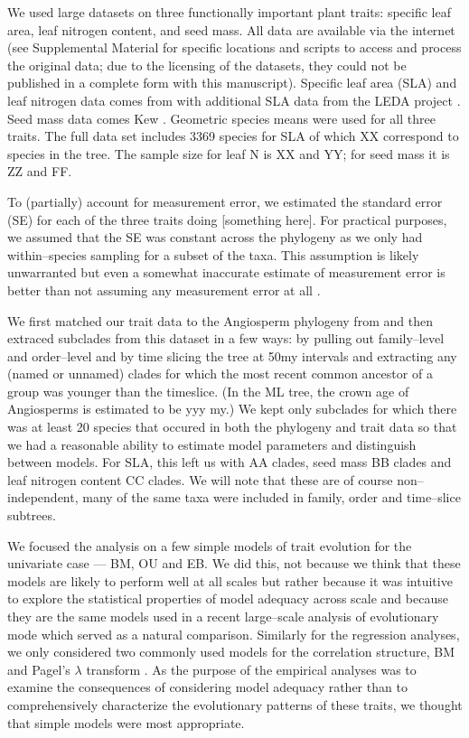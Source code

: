 \documentclass[a4paper,12pt]{article}
\begin{document}
We used large datasets on three functionally important plant traits: specific leaf area, leaf nitrogen content, and seed mass.  All data are available via the internet (see Supplemental Material for specific locations and scripts to access and process the original data; due to the licensing of the datasets, they could not be published in a complete form with this manuscript). Specific leaf area (SLA) and leaf nitrogen data comes from \citet{Wright2004} with additional SLA data from the LEDA project \citep{Kleyer2008}.   Seed mass data comes Kew \citep{Kew2008}.  Geometric species means were used for all three traits.  The full data set includes 3369 species for SLA of which XX correspond to species in the \citet{Zanne2013} tree.  The sample size for leaf N is XX and YY; for seed mass it is ZZ and FF.  

To (partially) account for measurement error, we estimated the standard error (SE) for each of the three traits doing [something here]. For practical purposes, we assumed that the SE was constant across the phylogeny as we only had within--species sampling for a subset of the taxa. This assumption is likely unwarranted but even a somewhat inaccurate estimate of measurement error is better than not assuming any measurement error at all \citep{HarmonLosos2005}.

We first matched our trait data to the Angiosperm phylogeny from \citet{Zanne2013} and then extraced subclades from this dataset in a few ways: by pulling out family--level and order--level and by time slicing the tree at 50my intervals and extracting any (named or unnamed) clades for which the most recent common ancestor of a group was younger than the timeslice. (In the ML tree, the crown age of Angiosperms is estimated to be yyy my.) We kept only subclades for which there was at least 20 species that occured in both the phylogeny and trait data so that we had a reasonable ability to estimate model parameters and distinguish between models. For SLA, this left us with AA clades, seed mass BB clades and leaf nitrogen content CC clades. We will note that these are of course non--independent, many of the same taxa were included in family, order and time--slice subtrees. 

We focused the analysis on a few simple models of trait evolution for the univariate case --- BM, OU and EB. We did this, not because we think that these models are likely to perform well at all scales but rather because it was intuitive to explore the statistical properties of model adequacy across scale and because they are the same models used in a recent large--scale analysis of evolutionary mode \citep{Harmon2010} which served as a natural comparison. Similarly for the regression analyses, we only considered two commonly used models for the correlation structure, BM and Pagel's $\lambda$ transform \citep{Pagel1997} \citep[see, for example][]{Revell2010, Freckleton2011}. As the purpose of the empirical analyses was to examine the consequences of considering model adequacy rather than to comprehensively characterize the evolutionary patterns of these traits, we thought that simple models were most appropriate.
\end{document}

